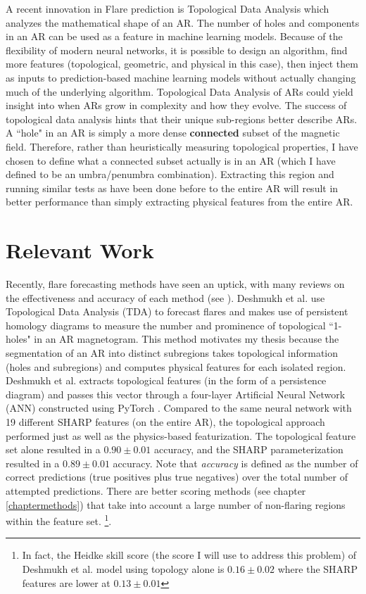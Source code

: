 A recent innovation in Flare prediction is Topological Data Analysis which analyzes the mathematical shape of an AR. The number of holes and components in an AR can be used as a feature in machine learning models. Because of the flexibility of modern neural networks, it is possible to design an algorithm, find more features (topological, geometric, and physical in this case), then inject them as inputs to prediction-based machine learning models without actually changing much of the underlying algorithm. Topological Data Analysis of ARs could yield insight into when ARs grow in complexity and how they evolve. The success of topological data analysis hints that their unique sub-regions better describe ARs. A ``hole" in an AR is simply a more dense \textbf{connected} subset of the magnetic field. Therefore, rather than heuristically measuring topological properties, I have chosen to define what a connected subset actually is in an AR (which I have defined to be an umbra/penumbra combination). Extracting this region and running similar tests as have been done before to the entire AR will result in better performance than simply extracting physical features from the entire AR. 

\section{Relevant Work}
\label{relevantworkchap}

Recently, flare forecasting methods have seen an uptick, with many reviews on the effectiveness and accuracy of each method (see \cite{Comparison1} \cite{Comparison2} \cite{Comparison3} \cite{Comparison4}). Deshmukh et al. \cite{varad} use Topological Data Analysis (TDA) to forecast flares and makes use of persistent homology diagrams to measure the number and prominence of topological ``1-holes" in an AR magnetogram. This method motivates my thesis because the segmentation of an AR into distinct subregions takes topological information (holes and subregions) and computes physical features for each isolated region. Deshmukh et al. extracts topological features (in the form of a persistence diagram) and passes this vector through a four-layer Artificial Neural Network (ANN) constructed using PyTorch \cite{pytorch}. Compared to the same neural network with 19 different SHARP features (on the entire AR), the topological approach performed just as well as the physics-based featurization. The topological feature set alone resulted in a $0.90 \pm 0.01$ accuracy, and the SHARP parameterization resulted in a $0.89 \pm 0.01$ accuracy. Note that \textit{accuracy} is defined as the number of correct predictions (true positives plus true negatives) over the total number of attempted predictions. There are better scoring methods (see chapter \ref{chaptermethods}) that take into account a large number of non-flaring regions within the feature set. \footnote{In fact, the Heidke skill score (the score I will use to address this problem) of Deshmukh et al. model using topology alone is $0.16 \pm 0.02$ where the SHARP features are lower at $0.13 \pm 0.01$}.

